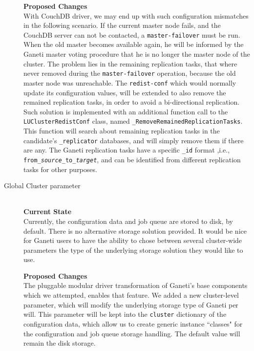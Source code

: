 \begin{description}
    \textbf{Proposed Changes} \\
    With CouchDB driver, we may end up with such configuration mismatches in the
    following scenario. If the current master node fails, and the CouchDB server
    can not be contacted, a \texttt{master-failover} must be run. When the old
    master becomes available again, he will be informed by the Ganeti master
    voting procedure that he is no longer the master node of the cluster. The
    problem lies in the remaining replication tasks, that where never removed
    during the \texttt{master-failover} operation, because the old master node
    was unreachable. The \texttt{redist-conf} which would normally update its
    configuration values, will be extended to also remove the remained
    replication tasks, in order to avoid a bi-directional replication. Such
    solution is implemented with an additional function call to the
    \texttt{LUClusterRedistConf} class, named
    \texttt{\_RemoveRemainedReplicationTasks}. This function will search about
    remaining replication tasks in the candidate's \texttt{\_replicator}
    databases, and will simply remove them if there are any. The Ganeti
    replication tasks have a specific \texttt{\_id} format ,i.e.,
    \texttt{from\_\emph{source}\_to\_\emph{target}}, and can be identified
    from different replication tasks for other purposes.
  \item[Global Cluster parameter] \hfill \\
    \textbf{Current State} \\
    Currently, the configuration data and job queue are stored to disk, by
    default. There is no alternative storage solution provided. It would be nice
    for Ganeti users to have the ability to chose between several cluster-wide
    parameters the type of the underlying storage solution they would like to
    use.

    \textbf{Proposed Changes} \\
    The pluggable modular driver transformation of Ganeti's base components
    which we attempted, enables that feature. We added a new cluster-level
    parameter, which will modify the underlying storage type of Ganeti per
    will. This parameter will be kept into the \texttt{cluster} dictionary of
    the configuration data, which allow us to create generic instance
    ``classes" for the configuration and job queue storage handling. The
    default value will remain the disk storage.
\end{description}

